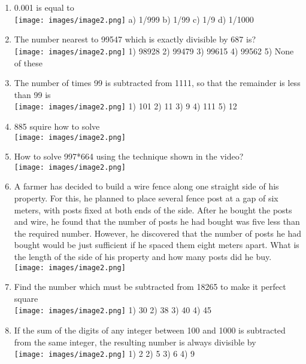 \documentclass[
]{article}
\begin{document}
\begin{enumerate}
\item 0.001 is equal to \\
\texttt{[image: images/image2.png]} a) 1/999 b) 1/99 c) 1/9 d) 1/1000



\item The number nearest to 99547 which is exactly divisible by 687 is?\\
\texttt{[image: images/image2.png]} 1) 98928 	2) 99479 	3) 99615 	4) 99562 	5) None of these
\item The number of times 99 is subtracted from 1111, so that the remainder is less than 99 is \\
\texttt{[image: images/image2.png]} 1) 101 	2) 11 	3) 9 	4) 111 	5) 12
\item 885 squire how to solve \\
\texttt{[image: images/image2.png]} 
\item How to solve 997*664 using the technique shown in the video? \\
\texttt{[image: images/image2.png]} 
\item A farmer has decided to build a wire fence along one straight side of his property. For this, he planned to place several fence post at a gap of six meters, with posts fixed at both ends of the side. After he bought the posts and wire, he found that the number of posts he had bought was five less than the required number. However, he discovered that the number of posts he had bought would be just sufficient if he spaced them eight meters apart. What is the length of the side of his property and how many posts did he buy.  \\
\texttt{[image: images/image2.png]} 
	\item Find the number which must be subtracted from 18265 to make it perfect square  \\
	\texttt{[image: images/image2.png]} 1) 30 	2) 38 	3) 40 	4) 45
\item If the sum of the digits of any integer between 100 and 1000 is subtracted from the same integer, the resulting number is always divisible by  \\
	\texttt{[image: images/image2.png]} 1) 2 	2) 5 	3) 6 	4) 9



\end{enumerate}
\end{document}
